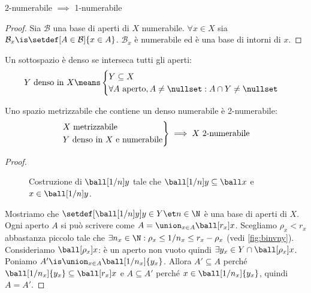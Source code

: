 
\begin{lemma}
	2-numerabile $\implies$ 1-numerabile
\end{lemma}

\begin{proof}
	Sia $\mathcal B$ una base di aperti di $X$ numerabile.
	$\forall x\in X$ sia $\mathcal B_x\is\setdef[A\in\mathcal B]{x\in A}$.
	$\mathcal B_x$ è numerabile ed è una base di intorni di $x$.
\end{proof}

\begin{defn}[Densità]
	Un sottospazio è denso se interseca tutti gli aperti:
	\[\text{$Y$ denso in $X$}\means
	\begin{cases}
		Y\subseteq X\\
		\forall A\text{ aperto},A\neq\nullset:A\cap Y\neq\nullset
	\end{cases}\]
\end{defn}

\begin{lemma}
	\label{th:metrdens2num}
	Uno spazio metrizzabile che contiene un denso numerabile è 2-numerabile:
	\[\begin{rcases}
		X\text{ metrizzabile}\\
		\text{$Y$ denso in $X$ e numerabile}
	\end{rcases}\implies
	X\text{ 2-numerabile}\]
\end{lemma}

\begin{proof}
	\begin{figure}
		\label{fig:binvny}
		\centering
		\caption{Costruzione di $\ball[1/n]y$ tale che $\ball[1/n]y\subseteq\ball x$ e $x\in\ball[1/n]y$.}
	\end{figure}
	Mostriamo che $\setdef[{\ball[1/n]y}]{y\in Y\et n\in\N}$ è una base di aperti di $X$.
	Ogni aperto $A$ si può scrivere come $A=\union_{x\in A}\ball[r_x]x$.
	Scegliamo $\rho_x<r_x$ abbastanza piccolo tale che $\exists n_x\in\N:\rho_x\leq 1/n_x\leq r_x-\rho_x$ (vedi \autoref{fig:binvny}).
	Consideriamo $\ball[\rho_x]x$: è un aperto non vuoto quindi $\exists y_x\in Y\cap\ball[\rho_x]x$.
	Poniamo $A'\is\union_{x\in A}\ball[1/n_x]{y_x}$.
	Allora $A'\subseteq A$ perché $\ball[1/n_x]{y_x}\subseteq\ball[r_x]x$
	e $A\subseteq A'$ perché $x\in\ball[1/n_x]{y_x}$,
	quindi $A=A'$.
\end{proof}


